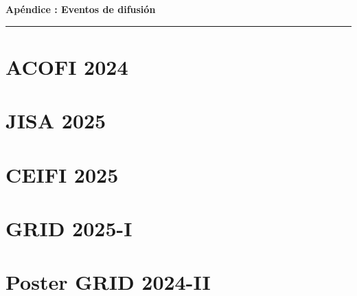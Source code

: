 

\FloatBarrier
\cleardoublepage
{}
{}

\vspace{40pt}
{\centering \normalfont\huge\bfseries Apéndice \thechapter: Eventos de difusión \par}
\vspace{10pt}
{\centering \rule{\textwidth}{0.4pt} \par}
\vspace{40pt}

\label{apendice:eventos-difusion}

\FloatBarrier\section{ACOFI 2024}


\FloatBarrier\section{JISA 2025}


\FloatBarrier\section{CEIFI 2025}


\FloatBarrier\section{GRID 2025-I }


\FloatBarrier\section{Poster GRID 2024-II}
